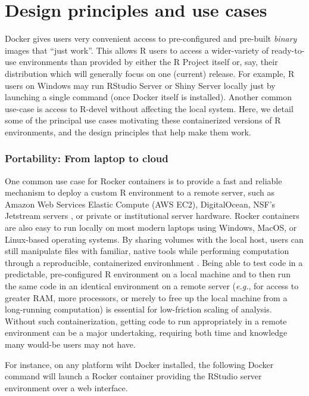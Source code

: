 \section{Design principles and use
cases}\label{design-principles-and-use-cases}

Docker gives users very convenient access to pre-configured and
pre-built \emph{binary} images that ``just work''. This allows R users
to access a wider-variety of ready-to-use environments than provided by
either the R Project itself or, say, their distribution which will
generally focus on one (current) release. For example, R users on
Windows may run RStudio\textsuperscript{\textregistered} Server or
Shiny\textsuperscript{\textregistered} Server locally just by launching
a single command (once Docker itself is installed). Another common
use-case is access to R-devel without affecting the local system. Here,
we detail some of the principal use cases motivating these containerized
versions of R environments, and the design principles that help make
them work.

\subsubsection{Portability: From laptop to
cloud}\label{portability-from-laptop-to-cloud}

One common use case for Rocker containers is to provide a fast and
reliable mechanism to deploy a custom R environment to a remote server,
such as Amazon Web Services Elastic Compute (AWS EC2), DigitalOcean,
NSF's Jetstream servers \citep{jetstream}, or private or institutional
server hardware. Rocker containers are also easy to run locally on most
modern laptops using Windows, MacOS, or Linux-based operating systems.
By sharing volumes with the local host, users can still manipulate files
with familiar, native tools while performing computation through a
reproducible, containerized environhment \citep{Boettiger2015}. Being
able to test code in a predictable, pre-configured R environment on a
local machine and to then run the same code in an identical environment
on a remote server (\emph{e.g.}, for access to greater RAM, more
processors, or merely to free up the local machine from a long-running
computation) is essential for low-friction scaling of analysis. Without
such containerization, getting code to run appropriately in a remote
environment can be a major undertaking, requiring both time and
knowledge many would-be users may not have.

For instance, on any platform wiht Docker installed, the following
Docker command will launch a Rocker container providing the
RStudio\textsuperscript{\textregistered} server environment over a web
interface.

